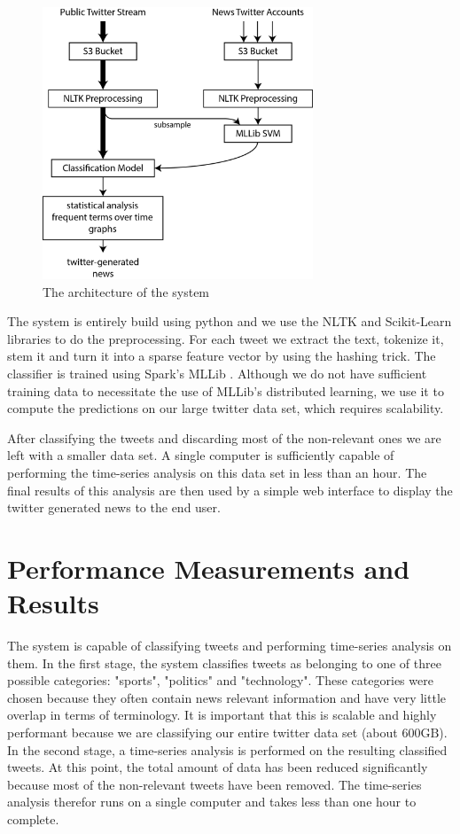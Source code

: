 \documentclass{llncs}
\begin{document}
\begin{figure}
	\centering
	\includegraphics[width=0.72\textwidth]{images/system_arch.png} 
	\caption{The architecture of the system}
	\label{fig:architecture}
\end{figure}

The system is entirely build using python and we use the NLTK \cite{nltk} and Scikit-Learn \cite{scikit-learn} libraries to do the preprocessing. For each tweet we extract the text, tokenize it, stem it and turn it into a sparse feature vector by using the hashing trick. The classifier is trained using Spark's MLLib \cite{mllib}. Although we do not have sufficient training data to necessitate the use of MLLib's distributed learning, we use it to compute the predictions on our large twitter data set, which requires scalability.

After classifying the tweets and discarding most of the non-relevant ones we are left with a smaller data set. A single computer is sufficiently capable of performing the time-series analysis on this data set in less than an hour. The final results of this analysis are then used by a simple web interface to display the twitter generated news to the end user.

\section{Performance Measurements and Results}
The system is capable of classifying tweets and performing time-series analysis on them. In the first stage, the system classifies tweets as belonging to one of three possible categories: "sports", "politics" and "technology". These categories were chosen because they often contain news relevant information and have very little overlap in terms of terminology. It is important that this is scalable and highly performant because we are classifying our entire twitter data set (about $600\text{GB}$). In the second stage, a time-series analysis is performed on the resulting classified tweets. At this point, the total amount of data has been reduced significantly because most of the non-relevant tweets have been removed. The time-series analysis therefor runs on a single computer and takes less than one hour to complete.
\end{document}
